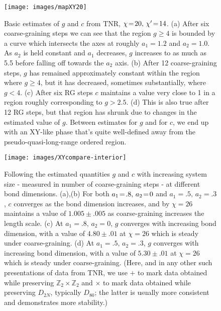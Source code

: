 \documentclass[aps,prb,letterpaper,superscriptaddress,twocolumn,showpacs,floatfix,10pt]{revtex4-1}
\begin{document}
\begin{figure} [h!]
\texttt{[image: images/mapXY20]}
\caption{Basic estimates of $g$ and $c$ from TNR, $\chi\nobreak\!=\nobreak\!20, \,\chi'\nobreak\!=\nobreak\!14$.
(a) After six coarse-graining steps we can see that the region $g \geq 4$ is
bounded by a curve which intersects the axes at roughly $a_1 = 1.2$ and
$a_2=1.0$.  As $a_2$ is held constant and $a_1$ decreases, $g$ increases to as
much as 5.5 before falling off towards the $a_2$ axis.
(b) After 12 coarse-graining steps, $g$ has remained approximately constant
within the region where $g \geq 4$, but it
has decreased, sometimes substantially,
where $g < 4$. (c) After six RG steps $c$ maintains a value very close to 1 in
a region roughly corresponding to $g > 2.5$. (d) This is also true after 12
RG steps, but that region has shrunk due to changes in the estimated value of
$g$. Between estimates for $g$ and for $c$, we end up with an XY-like phase
that's quite well-defined away from the pseudo-quasi-long-range ordered region.}
\label{fig:XYmaps20}
\end{figure}

\begin{figure}[h!]
\texttt{[image: images/XYcompare-interior]}
\caption{Following the estimated quantities $g$ and $c$ with increasing
system size - measured in number of coarse-graining steps - at
different bond dimensions. (a),(b) For both $a_1\nobreak\!=\nobreak\!.8, \,a_2\nobreak\!=\nobreak\!0$ and $a_1\!=\!.5,\,a_2\!=.\!3$,
$c$ converges as the bond dimension increases, and by $\chi\!=\!26$ maintains
a value of $1.005\pm.005$ as coarse-graining increases the length scale.
(c) At $a_1\!=\!.8,\,a_2\!=\!0$,
$g$ converges with increasing bond dimension, with a value of $4.80\pm .01$
at $\chi\!=\!26$
which is steady under coarse-graining. (d) At $a_1\!=\!.5,\,a_2\!=\!.3$, $g$ converges
with increasing bond dimension, with a value of $5.30\pm .01 $ at $\chi\!=\!26$
which is steady under coarse-graining.
(Here, and in any other such presentations of data from TNR, we use
$+$ to mark data obtained while preserving $\mathbb{Z}_2\times\mathbb{Z}_2$
and $\times$ to mark data obtained while preserving
$D_{2N}$, typically $D_{80}$; the latter is usually more consistent and
demonstrates more stability.)}
\label{fig:XYcompare-interior}
\end{figure}
\end{document}

